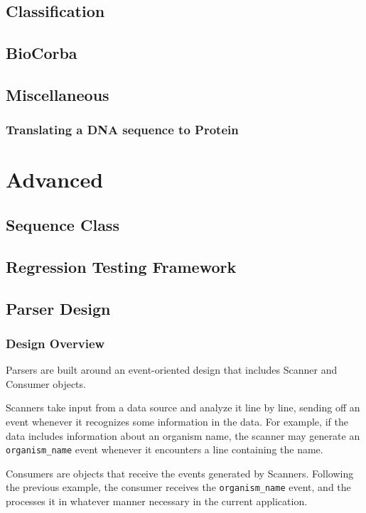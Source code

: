 \documentclass{article}
\begin{document}
\subsection{Classification}

\subsection{BioCorba}

\subsection{Miscellaneous}

\subsubsection{Translating a DNA sequence to Protein}

\section{Advanced}

\subsection{Sequence Class}

\subsection{Regression Testing Framework}

\subsection{Parser Design}

\subsubsection{Design Overview}

Parsers are built around an event-oriented design that includes
Scanner and Consumer objects.


Scanners take input from a data source and analyze it line by line,
sending off an event whenever it recognizes some information in the
data.  For example, if the data includes information about an organism
name, the scanner may generate an \verb|organism_name| event whenever it
encounters a line containing the name.


Consumers are objects that receive the events generated by Scanners.
Following the previous example, the consumer receives the
\verb|organism_name| event, and the processes it in whatever manner
necessary in the current application.
\end{document}

